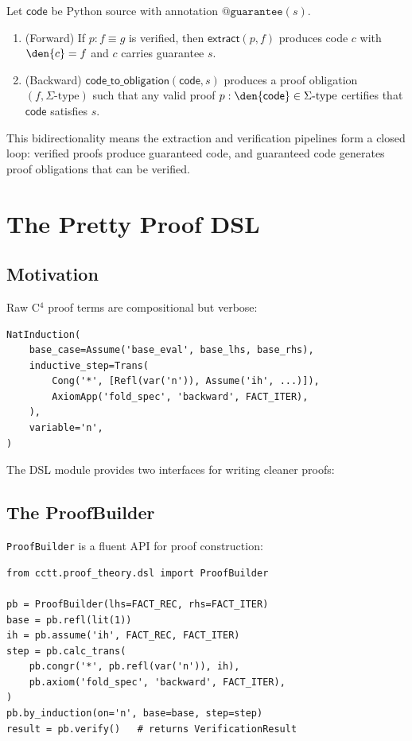 \begin{theorem}
Let $\mathsf{code}$ be Python source with annotation
$\texttt{@guarantee}(s)$.
\begin{enumerate}
  \item (Forward) If $p : f \equiv g$ is verified, then
    $\mathsf{extract}(p, f)$ produces code $c$ with
    $\den{c} = f$ and $c$ carries guarantee $s$.
  \item (Backward) $\mathsf{code\_to\_obligation}(\mathsf{code}, s)$
    produces a proof obligation $(f, \Sigma\text{-type})$ such that
    any valid proof $p : \den{\mathsf{code}} \in \Sigma\text{-type}$
    certifies that $\mathsf{code}$ satisfies $s$.
\end{enumerate}
\end{theorem}

This bidirectionality means the extraction and verification pipelines
form a closed loop: verified proofs produce guaranteed code, and
guaranteed code generates proof obligations that can be verified.


\section{The Pretty Proof DSL}

\subsection{Motivation}

Raw C$^4$ proof terms are compositional but verbose:

\begin{lstlisting}
NatInduction(
    base_case=Assume('base_eval', base_lhs, base_rhs),
    inductive_step=Trans(
        Cong('*', [Refl(var('n')), Assume('ih', ...)]),
        AxiomApp('fold_spec', 'backward', FACT_ITER),
    ),
    variable='n',
)
\end{lstlisting}

The DSL module provides two interfaces for writing cleaner proofs:

\subsection{The ProofBuilder}

\texttt{ProofBuilder} is a fluent API for proof construction:

\begin{lstlisting}
from cctt.proof_theory.dsl import ProofBuilder

pb = ProofBuilder(lhs=FACT_REC, rhs=FACT_ITER)
base = pb.refl(lit(1))
ih = pb.assume('ih', FACT_REC, FACT_ITER)
step = pb.calc_trans(
    pb.congr('*', pb.refl(var('n')), ih),
    pb.axiom('fold_spec', 'backward', FACT_ITER),
)
pb.by_induction(on='n', base=base, step=step)
result = pb.verify()   # returns VerificationResult
\end{lstlisting}

